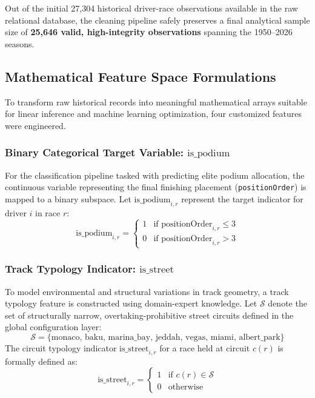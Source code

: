 Out of the initial 27,304 historical driver-race observations available in the raw relational database, the cleaning pipeline safely preserves a final analytical sample size of \textbf{25,646 valid, high-integrity observations} spanning the 1950--2026 seasons.

\subsection{Mathematical Feature Space Formulations}
\label{subsec:feature_engineering_math}

To transform raw historical records into meaningful mathematical arrays suitable for linear inference and machine learning optimization, four customized features were engineered.

\subsubsection{Binary Categorical Target Variable: $\text{is\_podium}$}
For the classification pipeline tasked with predicting elite podium allocation, the continuous variable representing the final finishing placement (\texttt{positionOrder}) is mapped to a binary subspace. Let $\text{is\_podium}_{i,r}$ represent the target indicator for driver $i$ in race $r$:
\begin{equation}
\text{is\_podium}_{i,r} = \begin{cases} 
1 & \text{if } \text{positionOrder}_{i,r} \le 3 \\ 
0 & \text{if } \text{positionOrder}_{i,r} > 3 
\end{cases}
\end{equation}

\subsubsection{Track Typology Indicator: $\text{is\_street}$}
To model environmental and structural variations in track geometry, a track typology feature is constructed using domain-expert knowledge. Let $\mathcal{S}$ denote the set of structurally narrow, overtaking-prohibitive street circuits defined in the global configuration layer:
\begin{equation}
\mathcal{S} = \{\text{monaco, baku, marina\_bay, jeddah, vegas, miami, albert\_park}\}
\end{equation}
The circuit typology indicator $\text{is\_street}_{i,r}$ for a race held at circuit $c(r)$ is formally defined as:
\begin{equation}
\text{is\_street}_{i,r} = \begin{cases} 
1 & \text{if } c(r) \in \mathcal{S} \\ 
0 & \text{otherwise} 
\end{cases}
\end{equation}

